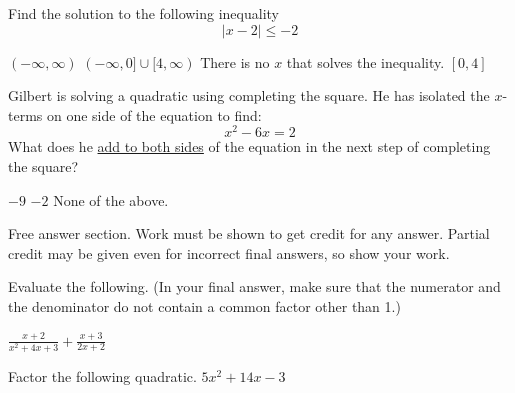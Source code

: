 \begin{questions}
\question[3] Find the solution to the following inequality
\[|x-2|\le-2\]
\begin{choices}
   \choice \chooseone $(-\infty,\infty)$
   \choice \chooseone $(-\infty,0]\cup[4,\infty)$
   \choice \chooseone There is no $x$ that solves the inequality.
   \choice \chooseone $[0,4]$
\end{choices}

\question[3] Gilbert is solving a quadratic using completing the square. He has isolated the $x$-terms on one side of the equation to find:
\[x^2-6x=2\]
What does he \underline{add to both sides} of the equation in the next step of completing the square?
\begin{choices}
    \choice {}
    \choice {}
    \choice \chooseone $-9$
    \choice \chooseone $-2$
    \choice \chooseone None of the above.
\end{choices}

\newpage
\hspace{-.5in}Free answer section. Work must be shown to get credit for any answer. Partial credit may be given even for incorrect final answers, so show your work.

\question[7] Evaluate the following. (In your final answer, make sure that the numerator and the denominator do not contain a common factor other than 1.)
     \vspace{.5cm}
     
     $\displaystyle{\frac{x+2}{x^2+4x+3}+\frac{x+3}{2x+2}}$
        \vfill
        \vfill


\question[6] Factor the following quadratic. 
     $5 x^2+14 x-3$
      \vfill


\end{questions}
